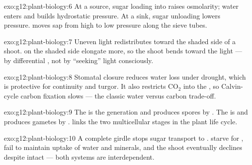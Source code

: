 \begin{solution}{exo:g12:plant-biology:6}
At a source, sugar loading into  raises osmolarity; water enters and
builds hydrostatic pressure. At a sink, sugar unloading lowers pressure.  moves sap from high to low pressure along the sieve tubes.
\end{solution}

\begin{solution}{exo:g12:plant-biology:7}
Uneven light redistributes  toward the shaded side of a shoot.  on
the shaded side elongate more, so the shoot bends toward the light ---
 by differential , not by ``seeking'' light consciously.
\end{solution}

\begin{solution}{exo:g12:plant-biology:8}
Stomatal closure reduces water loss under drought, which is protective for
 continuity and turgor. It also restricts $\mathrm{CO_2}$  into
the , so Calvin-cycle carbon fixation slows --- the classic water versus
carbon trade-off.
\end{solution}

\begin{solution}{exo:g12:plant-biology:9}
The  is the  generation and produces spores by . The
 is  and produces gametes by .  links the two multicellular stages in the plant life cycle.
\end{solution}

\begin{solution}{exo:g12:plant-biology:10}
A complete  girdle stops sugar transport to .  starve for
, fail to maintain uptake of water and minerals, and the shoot
eventually declines despite intact  --- both systems are interdependent.
\end{solution}

